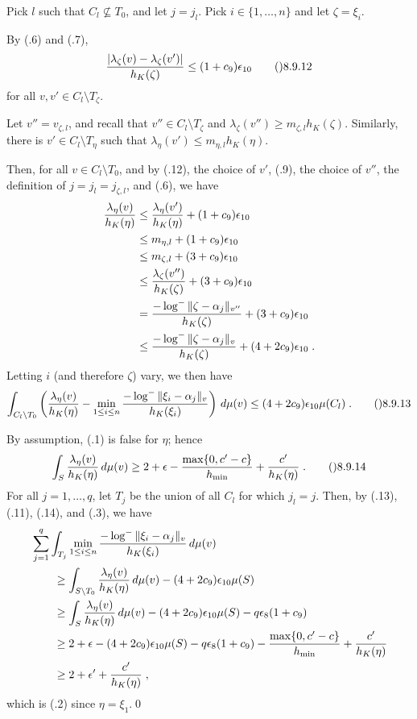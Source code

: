 Pick $l$ such that $C_l\nsubseteq T_0$, and let $j=j_l$.
Pick $i\in\{1,\dots,n\}$ and let $\zeta=\xi_i$.

By (.6) and (.7),
$$\frac{\left|\lambda_\zeta(v)-\lambda_\zeta(v')\right|}{h_K(\zeta)}
  \le (1+c_9)\epsilon_{10}\tag\08.9.12$$
for all $v,v'\in C_l\setminus T_\zeta$.

Let $v''=v_{\zeta,l}$, and recall that $v''\in C_l\setminus T_\zeta$
and $\lambda_\zeta(v'')\ge m_{\zeta,l}h_K(\zeta)$.
Similarly, there is $v'\in C_l\setminus T_\eta$ such that
$\lambda_\eta(v')\le m_{\eta,l}h_K(\eta)$.

Then, for all $v\in C_l\setminus T_0$, and
by (.12), the choice of $v'$, (.9), the choice of $v''$,
the definition of $j=j_l=j_{\zeta,l}$, and (.6), we have
$$\split \frac{\lambda_\eta(v)}{h_K(\eta)}
  &\le \frac{\lambda_\eta(v')}{h_K(\eta)} + (1+c_9)\epsilon_{10} \\
  &\le m_{\eta,l} + (1+c_9)\epsilon_{10} \\
  &\le m_{\zeta,l} + (3+c_9)\epsilon_{10} \\
  &\le \frac{\lambda_\zeta(v'')}{h_K(\zeta)} + (3+c_9)\epsilon_{10} \\
  &= \frac{-\log^{-}\|\zeta-\alpha_j\|_{v''}}{h_K(\zeta)}
    + (3+c_9)\epsilon_{10} \\
  &\le \frac{-\log^{-}\|\zeta-\alpha_j\|_v}{h_K(\zeta)} + (4+2c_9)\epsilon_{10}
  \;.\endsplit$$
Letting $i$ (and therefore $\zeta$) vary, we then have
$$\int_{C_l\setminus T_0} \left(\frac{\lambda_\eta(v)}{h_K(\eta)}
      - \min_{1\le i\le n}\frac{-\log^{-}\|\xi_i-\alpha_j\|_v}{h_K(\xi_i)}
    \right)\,d\mu(v)
  \le (4+2c_9)\epsilon_{10}\mu(C_l)\;.\tag\08.9.13$$

By assumption, (.1) is false for $\eta$; hence
$$\int_S \frac{\lambda_\eta(v)}{h_K(\eta)}\,d\mu(v)
  \ge 2+\epsilon - \frac{\max\{0,c'-c\}}{h_{\min}} + \frac{c'}{h_K(\eta)}\;.
  \tag\08.9.14$$
For all $j=1,\dots,q$, let $T_j$ be the union of all $C_l$ for which $j_l=j$.
Then, by (.13), (.11), (.14), and (.3), we have
$$\split & \sum_{j=1}^q \int_{T_j} \min_{1\le i\le n}
    \frac{-\log^{-}\|\xi_i-\alpha_j\|_v}{h_K(\xi_i)} \,d\mu(v) \\
  &\qquad\ge \int_{S\setminus T_0} \frac{\lambda_\eta(v)}{h_K(\eta)}\,d\mu(v)
    - (4+2c_9)\epsilon_{10}\mu(S) \\
  &\qquad\ge \int_S \frac{\lambda_\eta(v)}{h_K(\eta)}\,d\mu(v)
    - (4+2c_9)\epsilon_{10}\mu(S) - q\epsilon_8(1+c_9) \\
  &\qquad\ge 2+\epsilon - (4+2c_9)\epsilon_{10}\mu(S) - q\epsilon_8(1+c_9)
     - \frac{\max\{0,c'-c\}}{h_{\min}} + \frac{c'}{h_K(\eta)} \\
  &\qquad\ge 2+\epsilon' + \frac{c'}{h_K(\eta)}\;,\endsplit$$
which is (.2) since $\eta=\xi_1$.\qed
\enddemo

